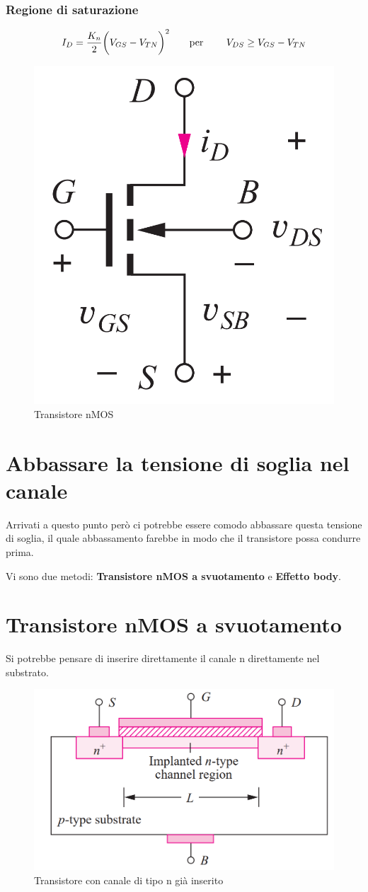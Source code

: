  \subsubsection{Regione di saturazione}
\begin{equation*}
    I_D = \frac{K_n}{2}\biggl(V_{GS}-V_{TN}\biggl)^2 \qquad\text{per } \qquad V_{DS} \geq V_{GS} - V_{TN}
\end{equation*}

\begin{figure}[htbp]
    \centering
    \includegraphics[width=0.2\linewidth]{img/nmossone.png}
    \caption{Transistore nMOS}
\end{figure}


\newpage
\section{Abbassare la tensione di soglia nel canale}
Arrivati a questo punto però ci potrebbe essere comodo abbassare questa tensione di soglia, il quale abbassamento farebbe in modo che il transistore possa condurre prima.

Vi sono due metodi: \textbf{Transistore	nMOS a	svuotamento} e \textbf{Effetto body}.


\section{Transistore	nMOS a	svuotamento}
Si potrebbe pensare di inserire direttamente il canale n direttamente nel substrato.

\begin{figure}[htbp]
    \centering
    \includegraphics[width=0.4\linewidth]{img/n-type_impllanted.png}
    \caption{Transistore con canale di tipo n già inserito}
    
\end{figure}

